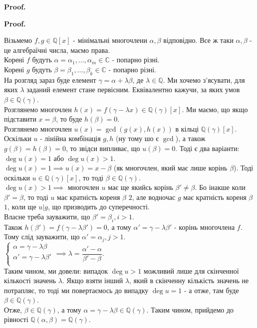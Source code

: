 \documentclass[a4paper, 10pt]{article}
\makeatletter
\theoremstyle{theoremdd}
\theoremstyle{theoremdd}
\theoremstyle{theoremdd}
\theoremstyle{theoremdd}
\theoremstyle{theoremdd}
\theoremstyle{theoremdd}
\theoremstyle{theoremdd}
\theoremstyle{theoremdd}
\renewenvironment{proof}[1][Proof.\\]{\par
\pushQED{\hfill \qed}%
\normalfont \topsep6\p@\@plus6\p@\relax
\trivlist
\item\relax
{\bfseries
#1\@addpunct{.}}\hspace\labelsep\ignorespaces
}{%
\popQED\endtrivlist\@endpefalse
}
\makeatother
\begin{document}
\begin{proof}
\begin{proof}
Візьмемо $f,g \in \mathbb{Q}[x]$ - мінімальні многочлени $\alpha,\beta$ відповідно. Все ж таки $\alpha,\beta$ - це алгебраїчні числа, маємо права.\\
Корені $f$ будуть $\alpha = \alpha_1,\dots,\alpha_m \in \mathbb{C}$ - попарно різні.\\
Корені $g$ будуть $\beta = \beta_1,\dots,\beta_k \in \mathbb{C}$ - попарно різні.\\
На розгляд зараз буде елемент $\gamma = \alpha + \lambda \beta$, де $\lambda \in \mathbb{Q}$. Ми хочемо з'ясувати, для яких $\lambda$ заданий елемент стане первісним. Еквівалентно кажучи, за яких умов $\beta \in \mathbb{Q}(\gamma)$.\\
Розглянемо многочлен $h(x) = f(\gamma - \lambda x) \in \mathbb{Q}(\gamma)[x]$. Ми маємо, що якщо підставити $x = \beta$, то буде $h(\beta) = 0$.\\
Розглянемо многочлен $u(x) = \gcd (g(x),h(x))$ в кільці $\mathbb{Q}(\gamma)[x]$.\\
Оскільки $u$ - лінійна комбінація $g,h$ (ну тому шо є $\gcd$), а також $g(\beta) = h(\beta) = 0$, то звідси випливає, що $u(\beta) = 0$. Тоді є два варіанти:\\
$\deg u(x) = 1$ або $\deg u(x) > 1$.\\
$\deg u(x) = 1 \implies u(x) = x-\beta$ (як многочлен, який має лише корінь $\beta$). Тоді оскільки $u \in \mathbb{Q}(\gamma)[x]$, то тоді $\beta \in \mathbb{Q}(\gamma)$.\\
$\deg u(x) > 1 \implies$ многочлен $u$ має ще якийсь корінь $\beta' \neq \beta$. Бо інакше коли $\beta' = \beta$, то тоді $u$ має кратність кореня $\beta$ $2$, але водночас $g$ має кратність кореня $\beta$ $1$, коли ще $u | g$, що призводить до суперечності.\\
Власне треба зауважити, що $\beta' = \beta_i, i > 1$.\\
Також $h(\beta') = f(\gamma-\lambda \beta') = 0$, а тому $\alpha' = \gamma - \lambda \beta'$ - корінь многочлена $f$. Тому слід зауважити, що $\alpha' = \alpha_j, j > 1$.\\
$\begin{cases}
\alpha = \gamma - \lambda \beta \\
\alpha' = \gamma - \lambda \beta' \\
\end{cases} \implies \lambda = \dfrac{\alpha'-\alpha}{\beta'-\beta}$.\\
Таким чином, ми довели: випадок $\deg u > 1$ можливий лише для скінченної кількості значень $\lambda$. Якщо взяти інший $\lambda$, який в скінченну кількість значень не потрапляє, то тоді ми повертаємось до випадку $\deg u = 1$ - а отже, там буде $\beta \in \mathbb{Q}(\gamma)$.
\bigskip \\
Отже, $\beta \in \mathbb{Q}(\gamma)$, а тому $\alpha = \gamma - \lambda \beta \in \mathbb{Q}(\gamma)$. Таким чином, прийдемо до рівності $\mathbb{Q}(\alpha,\beta) = \mathbb{Q}(\gamma)$.
\end{proof}


\end{proof}
\end{document}

